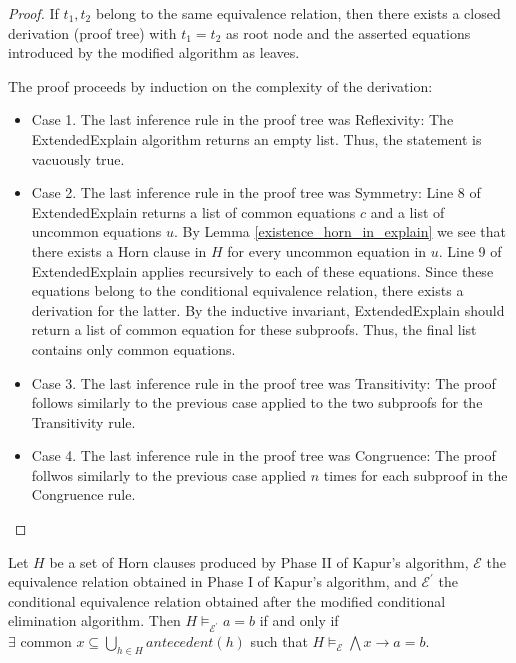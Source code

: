 \begin{proof} 
  If $t_1, t_2$ belong to the same equivalence relation,
  then there exists a closed derivation (proof tree) 
  with $t_1 = t_2$ as root node and the asserted
  equations introduced by the modified algorithm
  as leaves.

  The proof proceeds by induction on the complexity of the 
  derivation:

  \begin{itemize}
    \item Case 1. The last inference rule in the proof 
      tree was Reflexivity: The ExtendedExplain 
      algorithm returns an empty list. Thus, the
      statement is vacuously true.
    \item Case 2. The last inference rule in the proof 
      tree was Symmetry: Line 8 of ExtendedExplain
      returns a list of common equations $c$ and a list
      of uncommon equations $u$. 
      By Lemma \ref{existence_horn_in_explain}
      we see that there exists a Horn clause in $H$ for
      every uncommon equation in $u$. Line 9 of 
      ExtendedExplain applies recursively to each of 
      these equations. Since these equations belong
      to the conditional equivalence relation, there
      exists a derivation for the latter.
      By the inductive invariant, ExtendedExplain
      should return a list of common equation for 
      these subproofs. Thus, the final list contains
      only common equations.
    \item Case 3. The last inference rule in the proof 
      tree was Transitivity: The proof follows similarly
      to the previous case applied to the two subproofs
      for the Transitivity rule.
    \item Case 4. The last inference rule in the proof 
      tree was Congruence: The proof follwos similarly
      to the previous case applied $n$ times for each
      subproof in the Congruence rule.
  \end{itemize}
\end{proof}

\begin{corollary}
  Let $H$ be a set of Horn clauses produced by 
  Phase II of Kapur's algorithm, $\mathcal{E}$ the 
  equivalence relation obtained in Phase I of Kapur's 
  algorithm, and $\mathcal{E^{'}}$ the conditional 
  equivalence relation obtained after the modified
  conditional elimination algorithm. Then
  $H \models_{\mathcal{E^{'}}} a = b$ if and only if
  $\exists \text{ common } x \subseteq 
  \bigcup_{h \in H} antecedent(h)$ such that
  $H \models_{\mathcal{E}} \bigwedge x \rightarrow a = b$.
\end{corollary}

